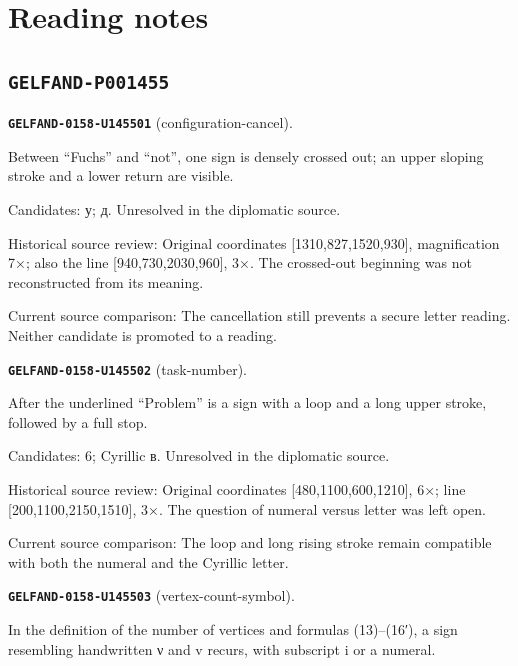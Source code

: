 \section*{Reading notes}
\subsection*{\texttt{GELFAND-P001455}}
\par\noindent\leavevmode{}\label{GELFAND-0158-U145501}\label{GELFAND-P001455:configuration-cancel}\textbf{\texttt{GELFAND-0158-U145501}} (configuration-cancel).\nopagebreak[4]\par
Between “Fuchs” and “not”, one sign is densely crossed out; an upper sloping stroke and a lower return are visible.\par
Candidates: у; д. Unresolved in the diplomatic source.\par
Historical source review: Original coordinates [1310,827,1520,930], magnification 7×; also the line [940,730,2030,960], 3×. The crossed-out beginning was not reconstructed from its meaning.\par
Current source comparison: The cancellation still prevents a secure letter reading. Neither candidate is promoted to a reading.\par\medskip
\par\noindent\leavevmode{}\label{GELFAND-0158-U145502}\label{GELFAND-P001455:task-number}\textbf{\texttt{GELFAND-0158-U145502}} (task-number).\nopagebreak[4]\par
After the underlined “Problem” is a sign with a loop and a long upper stroke, followed by a full stop.\par
Candidates: 6; Cyrillic в. Unresolved in the diplomatic source.\par
Historical source review: Original coordinates [480,1100,600,1210], 6×; line [200,1100,2150,1510], 3×. The question of numeral versus letter was left open.\par
Current source comparison: The loop and long rising stroke remain compatible with both the numeral and the Cyrillic letter.\par\medskip
\par\noindent\leavevmode{}\label{GELFAND-0158-U145503}\label{GELFAND-P001455:vertex-count-symbol}\textbf{\texttt{GELFAND-0158-U145503}} (vertex-count-symbol).\nopagebreak[4]\par
In the definition of the number of vertices and formulas (13)–(16′), a sign resembling handwritten ν and v recurs, with subscript i or a numeral.\par
